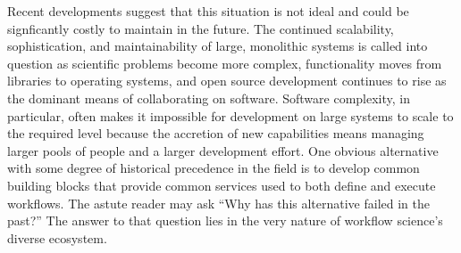 Recent developments suggest that this situation is not ideal and could be
signficantly costly to maintain in the future. The continued scalability,
sophistication, and maintainability of large, monolithic systems is called into
question as scientific problems become more complex, functionality moves from
libraries to operating systems, and open source development continues to rise
as the dominant means of collaborating on software. Software complexity, in
particular, often makes it impossible for development on large systems to scale
to the required level because the accretion of new capabilities means managing
larger pools of people and a larger development effort. One obvious
alternative with some degree of historical precedence in the field is to
develop common building blocks that provide common services used to both define
and execute workflows. The astute reader may ask ``Why has this alternative
failed in the past?'' The answer to that question lies in the very nature of
workflow science's diverse ecosystem. 

